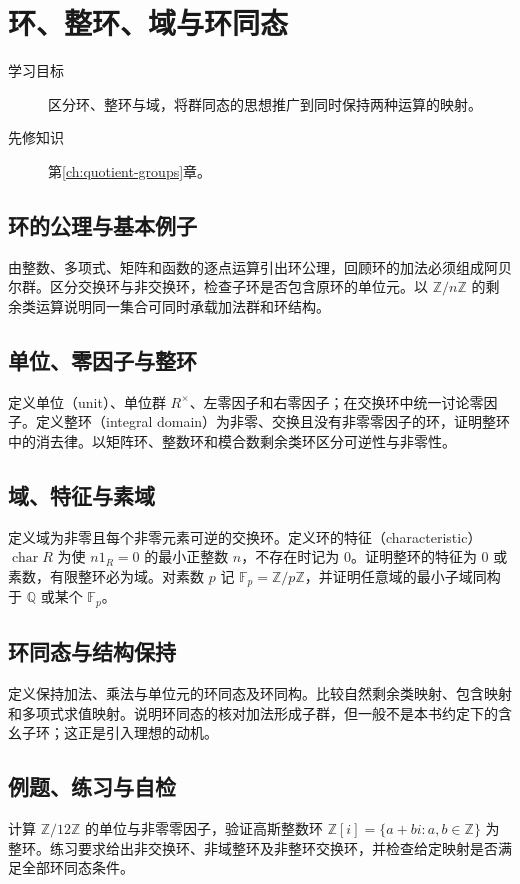 \setcounter{chapter}{9} %
\chapter{环、整环、域与环同态}\label{ch:rings}

\begin{description}
  \item[学习目标] 区分环、整环与域，将群同态的思想推广到同时保持两种运算的映射。
  \item[先修知识] 第\ref{ch:quotient-groups}章。
\end{description}

\section{环的公理与基本例子}
由整数、多项式、矩阵和函数的逐点运算引出环公理，回顾环的加法必须组成阿贝尔群。区分交换环与非交换环，检查子环是否包含原环的单位元。以 $\mathbb Z/n\mathbb Z$ 的剩余类运算说明同一集合可同时承载加法群和环结构。

\section{单位、零因子与整环}
定义单位（unit）、单位群 $R^\times$、左零因子和右零因子；在交换环中统一讨论零因子。定义整环（integral domain）为非零、交换且没有非零零因子的环，证明整环中的消去律。以矩阵环、整数环和模合数剩余类环区分可逆性与非零性。

\section{域、特征与素域}
定义域为非零且每个非零元素可逆的交换环。定义环的特征（characteristic）$\operatorname{char}R$ 为使 $n1_R=0$ 的最小正整数 $n$，不存在时记为 $0$。证明整环的特征为 $0$ 或素数，有限整环必为域。对素数 $p$ 记 $\mathbb F_p=\mathbb Z/p\mathbb Z$，并证明任意域的最小子域同构于 $\mathbb Q$ 或某个 $\mathbb F_p$。

\section{环同态与结构保持}
定义保持加法、乘法与单位元的环同态及环同构。比较自然剩余类映射、包含映射和多项式求值映射。说明环同态的核对加法形成子群，但一般不是本书约定下的含幺子环；这正是引入理想的动机。

\section{例题、练习与自检}
计算 $\mathbb Z/12\mathbb Z$ 的单位与非零零因子，验证高斯整数环 $\mathbb Z[i]=\{a+bi:a,b\in\mathbb Z\}$ 为整环。练习要求给出非交换环、非域整环及非整环交换环，并检查给定映射是否满足全部环同态条件。

